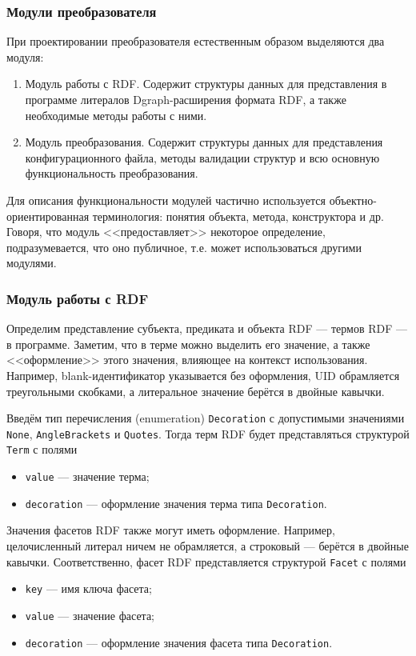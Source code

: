 \subsubsection{Модули преобразователя}

При проектировании преобразователя естественным образом выделяются два модуля:
\begin{enumerate}
  \item Модуль работы с RDF. Содержит структуры данных для представления в программе литералов Dgraph-расширения
    формата RDF, а также необходимые методы работы с ними.
  \item Модуль преобразования. Содержит структуры данных для представления конфигурационного файла, методы валидации
    структур и всю основную функциональность преобразования.
\end{enumerate}

Для описания функциональности модулей частично используется объектно-ориентированная терминология: понятия объекта,
метода, конструктора и др. Говоря, что модуль <<предоставляет>> некоторое определение, подразумевается, что оно
публичное, т.е. может использоваться другими модулями.

\subsubsection{Модуль работы с RDF}

Определим представление субъекта, предиката и объекта RDF --- термов RDF --- в программе. Заметим, что в терме можно
выделить его значение, а также <<оформление>> этого значения, влияющее на контекст использования. Например,
blank-идентификатор указывается без оформления, UID обрамляется треугольными скобками, а литеральное значение берётся в
двойные кавычки.

Введём тип перечисления (enumeration) \texttt{Decoration} с допустимыми значениями \texttt{None}, \texttt{AngleBrackets}
и \texttt{Quotes}. Тогда терм RDF будет представляться структурой \texttt{Term} с полями
\begin{itemize}
  \item \texttt{value} --- значение терма;
  \item \texttt{decoration} --- оформление значения терма типа \texttt{Decoration}.
\end{itemize}

Значения фасетов RDF также могут иметь оформление. Например, целочисленный литерал ничем не обрамляется, а строковый ---
берётся в двойные кавычки. Соответственно, фасет RDF представляется структурой \texttt{Facet} с полями
\begin{itemize}
  \item \texttt{key} --- имя ключа фасета;
  \item \texttt{value} --- значение фасета;
  \item \texttt{decoration} --- оформление значения фасета типа \texttt{Decoration}.
\end{itemize}

